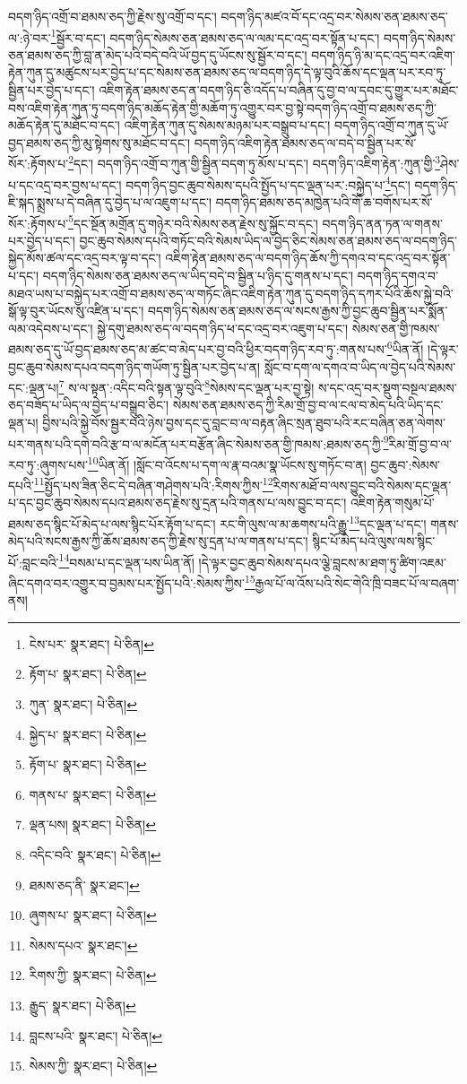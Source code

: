 བདག་ཉིད་འགྲོ་བ་ཐམས་ཅད་ཀྱི་རྗེས་སུ་འགྲོ་བ་དང་། བདག་ཉིད་མཛའ་བོ་དང་འདྲ་བར་སེམས་ཅན་ཐམས་ཅད་ལ་:ཉེ་བར་\footnote{ངེས་པར་  སྣར་ཐང་།  པེ་ཅིན། }སྦྱོར་བ་དང་། བདག་ཉིད་སེམས་ཅན་ཐམས་ཅད་ལ་ལམ་དང་འདྲ་བར་སྟོན་པ་དང་། བདག་ཉིད་སེམས་ཅན་ཐམས་ཅད་ཀྱི་བླ་ན་མེད་པའི་བདེ་བའི་ཡོ་བྱད་དུ་ཡོངས་སུ་སྦྱོར་བ་དང་། བདག་ཉིད་ཉི་མ་དང་འདྲ་བར་འཇིག་རྟེན་ཀུན་དུ་མཚུངས་པར་བྱེད་པ་དང་སེམས་ཅན་ཐམས་ཅད་ལ་བདག་ཉིད་དེ་ལྟ་བུའི་ཆོས་དང་ལྡན་པར་རབ་ཏུ་སྦྱིན་པར་བྱེད་པ་དང་། འཇིག་རྟེན་ཐམས་ཅད་ན་བདག་ཉིད་ཅི་འདོད་པ་བཞིན་དུ་བྱ་བ་ལ་དབང་དུ་གྱུར་པར་མཐོང་བས་འཇིག་རྟེན་ཀུན་ཏུ་བདག་ཉིད་མཆོད་རྟེན་གྱི་མཆོག་ཏུ་འགྱུར་བར་བྱ་སྟེ་བདག་ཉིད་འགྲོ་བ་ཐམས་ཅད་ཀྱི་མཆོད་རྟེན་དུ་མཐོང་བ་དང་། འཇིག་རྟེན་ཀུན་དུ་སེམས་མཉམ་པར་བསྒྲུབ་པ་དང་། བདག་ཉིད་འགྲོ་བ་ཀུན་དུ་ཡོ་བྱད་ཐམས་ཅད་ཀྱི་མུ་སྟེགས་སུ་མཐོང་བ་དང་། བདག་ཉིད་འཇིག་རྟེན་ཐམས་ཅད་ལ་བདེ་བ་སྦྱིན་པར་སོ་སོར་:རྟོགས་པ་\footnote{རྟོག་པ་  སྣར་ཐང་།  པེ་ཅིན། }དང་། བདག་ཉིད་འགྲོ་བ་ཀུན་གྱི་སྦྱིན་བདག་ཏུ་མོས་པ་དང་། བདག་ཉིད་འཇིག་རྟེན་:ཀུན་གྱི་\footnote{ཀུན་  སྣར་ཐང་།  པེ་ཅིན། }ཤེས་པ་དང་འདྲ་བར་བྱས་པ་དང་། བདག་ཉིད་བྱང་ཆུབ་སེམས་དཔའི་སྤྱོད་པ་དང་ལྡན་པར་:བསྐྱེད་པ་\footnote{སྐྱེད་པ་  སྣར་ཐང་།  པེ་ཅིན། }དང་། བདག་ཉིད་ཇི་སྐད་སྨྲས་པ་དེ་བཞིན་དུ་བྱེད་པ་ལ་འཇུག་པ་དང་། བདག་ཉིད་ཐམས་ཅད་མཁྱེན་པའི་གོ་ཆ་བགོས་པར་སོ་སོར་:རྟོགས་པ་\footnote{རྟོག་པ་  སྣར་ཐང་།  པེ་ཅིན། }དང་སྔོན་མགྲོན་དུ་གཉེར་བའི་སེམས་ཅན་རྗེས་སུ་སྐྱོང་བ་དང་། བདག་ཉིད་ནན་ཏན་ལ་གནས་པར་བྱེད་པ་དང་། བྱང་ཆུབ་སེམས་དཔའི་གཏོང་བའི་སེམས་ཡིད་ལ་བྱེད་ཅིང་སེམས་ཅན་ཐམས་ཅད་ལ་བདག་ཉིད་སྐྱེད་མོས་ཚལ་དང་འདྲ་བར་ལྟ་བ་དང་། འཇིག་རྟེན་ཐམས་ཅད་ལ་བདག་ཉིད་ཆོས་ཀྱི་དགའ་བ་དང་འདྲ་བར་སྟོན་པ་དང་། བདག་ཉིད་སེམས་ཅན་ཐམས་ཅད་ལ་ཡིད་བདེ་བ་སྦྱིན་པ་ཉིད་དུ་གནས་པ་དང་། བདག་ཉིད་དགའ་བ་མཐའ་ཡས་པ་བསྐྱེད་པར་འགྲོ་བ་ཐམས་ཅད་ལ་གཏོང་ཞིང་འཇིག་རྟེན་ཀུན་དུ་བདག་ཉིད་དཀར་པོའི་ཆོས་སྐྱེ་བའི་སྒོ་ལྟ་བུར་ཡོངས་སུ་འཛིན་པ་དང་། བདག་ཉིད་སེམས་ཅན་ཐམས་ཅད་ལ་སངས་རྒྱས་ཀྱི་བྱང་ཆུབ་སྦྱིན་པར་སྨོན་ལམ་འདེབས་པ་དང་། སྐྱེ་དགུ་ཐམས་ཅད་ལ་བདག་ཉིད་ཕ་དང་འདྲ་བར་འཇུག་པ་དང་། སེམས་ཅན་གྱི་ཁམས་ཐམས་ཅད་དུ་ཡོ་བྱད་ཐམས་ཅད་མ་ཚང་བ་མེད་པར་བྱ་བའི་ཕྱིར་བདག་ཉིད་རབ་ཏུ་:གནས་པས་\footnote{གནས་པ་  སྣར་ཐང་།  པེ་ཅིན། }ཡིན་ནོ། །དེ་ལྟར་བྱང་ཆུབ་སེམས་དཔའ་བདག་ཉིད་གཡོག་ཏུ་སྦྱིན་པར་བྱེད་པ་ན། སློང་བ་དག་ལ་དགའ་བ་ཡིད་ལ་བྱེད་པའི་སེམས་དང་:ལྡན་པ།\footnote{ལྡན་པས།  སྣར་ཐང་།  པེ་ཅིན། } ས་ལ་སྟན་:འདིང་བའི་སྟན་ལྟ་བུའི་\footnote{འདིང་བའི་  སྣར་ཐང་།  པེ་ཅིན། }སེམས་དང་ལྡན་པར་བྱ་སྟེ། ས་དང་འདྲ་བར་སྡུག་བསྔལ་ཐམས་ཅད་བཟོད་པ་ཡིད་ལ་བྱེད་པ་བསྒྲུབ་ཅིང་། སེམས་ཅན་ཐམས་ཅད་ཀྱི་རིམ་གྲོ་བྱ་བ་ལ་ངལ་བ་མེད་པའི་ཡིད་དང་ལྡན་པ། བྱིས་པའི་སྐྱེ་བོས་སྦྱར་བའི་ཉེས་བྱས་དང་དུ་བླང་བ་ལ་བརྟན་ཞིང་སྲན་ཐུབ་པའི་རང་བཞིན་ཅན་ལེགས་པར་གནས་པའི་དགེ་བའི་རྩ་བ་ལ་མངོན་པར་བརྩོན་ཞིང་སེམས་ཅན་གྱི་ཁམས་:ཐམས་ཅད་ཀྱི་\footnote{ཐམས་ཅད་ནི་  སྣར་ཐང་། }རིམ་གྲོ་བྱ་བ་ལ་རབ་ཏུ་:ཞུགས་པས་\footnote{ཞུགས་པ་  སྣར་ཐང་།  པེ་ཅིན། }ཡིན་ནོ། །སློང་བ་འོངས་པ་དག་ལ་རྣ་བའམ་སྣ་ཡོངས་སུ་གཏོང་བ་ན། བྱང་ཆུབ་:སེམས་དཔའི་\footnote{སེམས་དཔའ་  སྣར་ཐང་། }སྤྱོད་པས་ཟིན་ཅིང་དེ་བཞིན་གཤེགས་པའི་:རིགས་ཀྱིས་\footnote{རིགས་ཀྱི་  སྣར་ཐང་།  པེ་ཅིན། }རིགས་མཐོ་བ་ལས་བྱུང་བའི་སེམས་དང་ལྡན་པ་དང་བྱང་ཆུབ་སེམས་དཔའ་ཐམས་ཅད་རྗེས་སུ་དྲན་པའི་གནས་པ་ལས་བྱུང་བ་དང་། འཇིག་རྟེན་གསུམ་པོ་ཐམས་ཅད་སྙིང་པོ་མེད་པ་ལས་སྙིང་པོར་རྟོག་པ་དང་། རང་གི་ལུས་ལ་མ་ཆགས་པའི་རྒྱུ་\footnote{རྒྱུད་  སྣར་ཐང་།  པེ་ཅིན། }དང་ལྡན་པ་དང་། གནས་མེད་པའི་སངས་རྒྱས་ཀྱི་ཆོས་ཐམས་ཅད་ཀྱི་རྗེས་སུ་དྲན་པ་ལ་གནས་པ་དང་། སྙིང་པོ་མེད་པའི་ལུས་ལས་སྙིང་པོ་:བླང་བའི་\footnote{བླངས་པའི་  སྣར་ཐང་།  པེ་ཅིན། }བསམ་པ་དང་ལྡན་པས་ཡིན་ནོ། །དེ་ལྟར་བྱང་ཆུབ་སེམས་དཔའ་ལྕེ་བླངས་མ་ཐག་ཏུ་ཚིག་འཇམ་ཞིང་དགའ་བར་འགྱུར་བ་བྱམས་པར་སྤྱོད་པའི་:སེམས་ཀྱིས་\footnote{སེམས་ཀྱི་  སྣར་ཐང་།  པེ་ཅིན། }རྒྱལ་པོ་ལ་འོས་པའི་སེང་གེའི་ཁྲི་བཟང་པོ་ལ་བཞག་ནས། 